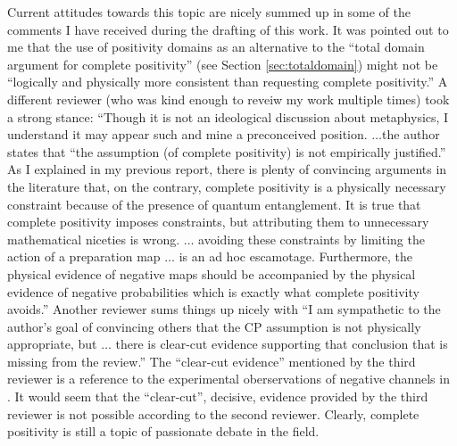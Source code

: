 Current attitudes towards this topic are nicely summed up in some of the comments I have received during the drafting of this work.  It was pointed out to me that the use of positivity domains as an alternative to the ``total domain argument for complete positivity'' (see Section \ref{sec:totaldomain}) might not be ``logically and physically more consistent than requesting complete positivity.''  A different reviewer (who was kind enough to reveiw my work multiple times) took a strong stance: ``Though it is not an ideological discussion about metaphysics, I understand it may appear such and mine a preconceived position. $\ldots$the author states that ``the assumption (of complete positivity) is not empirically justified.'' As I explained in my previous report, there is plenty of convincing arguments in the literature that, on the contrary, complete positivity is a physically necessary constraint because of the presence of quantum entanglement. It is true that complete positivity imposes constraints, but attributing them to unnecessary mathematical niceties is wrong.  $\ldots$ avoiding these constraints by limiting the action of a preparation map $\ldots$ is an ad hoc escamotage.  Furthermore, the physical evidence of negative maps should be accompanied by the physical evidence of negative probabilities which is exactly what complete positivity avoids.''  Another reviewer sums things up nicely with ``I am sympathetic to the author's goal of convincing others that the CP assumption is not physically appropriate, but $\ldots$ there is clear-cut evidence supporting that conclusion that is missing from the review.''  The ``clear-cut evidence'' mentioned by the third reviewer is a reference to the experimental oberservations of negative channels in \cite{Boulant2004}.  It would seem that the ``clear-cut'', decisive, evidence provided by the third reviewer is not possible according to the second reviewer.  Clearly, complete positivity is still a topic of passionate debate in the field.


